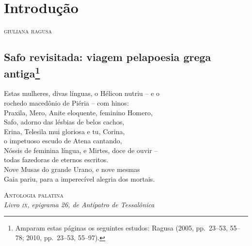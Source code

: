 \chapter*{Introdução}

\begin{flushright}
\textsc{giuliana ragusa}
\end{flushright}

\section*{Safo revisitada: viagem pela\break poesia grega
antiga\protect\footnote{\MakeUppercase{A}mparam estas páginas os seguintes estudos:
\MakeUppercase{R}agusa (2005, pp.~23--53, 55--78; 2010, pp.~23--53, 55--97).}}

\epigraph{Estas mulheres, divas línguas, o Hélicon nutriu -- e o  \\
rochedo macedônio de Piéria -- com hinos: \\
Praxila, Mero, Anite eloquente, feminino Homero, \\
Safo, adorno das lésbias de belos cachos, \\
Erina, Telesila mui gloriosa e tu, Corina, \\
o impetuoso escudo de Atena cantando, \\
Nóssis de feminina língua, e Mirtes, doce de ouvir --  \\
todas fazedoras de eternos escritos. \\
Nove Musas do grande Urano, e nove mesmas \\
Gaia pariu, para a imperecível alegria dos mortais.}
{\textsc{Antologia palatina}\footnotemark{}\\\textit{Livro \textsc{ix}, epigrama 26, de Antípatro de Tessalônica}\footnotemark{}}
\addtocounter{footnote}{-2}


